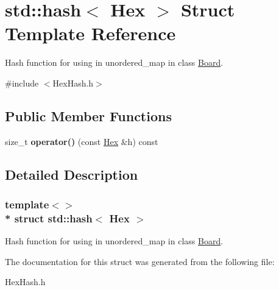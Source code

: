 \hypertarget{structstd_1_1hash_3_01Hex_01_4}{}\section{std\+:\+:hash$<$ Hex $>$ Struct Template Reference}
\label{structstd_1_1hash_3_01Hex_01_4}


Hash function for using in unordered\+\_\+map in class \hyperlink{classBoard}{Board}.  




{\ttfamily \#include $<$Hex\+Hash.\+h$>$}

\subsection*{Public Member Functions}
\begin{DoxyCompactItemize}
\item 
size\+\_\+t {\bfseries operator()} (const \hyperlink{classHex}{Hex} \&h) const \hypertarget{structstd_1_1hash_3_01Hex_01_4_a367202b40702ea479ccc72a798613a51}{}\label{structstd_1_1hash_3_01Hex_01_4_a367202b40702ea479ccc72a798613a51}

\end{DoxyCompactItemize}


\subsection{Detailed Description}
\subsubsection*{template$<$$>$\\*
struct std\+::hash$<$ Hex $>$}

Hash function for using in unordered\+\_\+map in class \hyperlink{classBoard}{Board}. 

The documentation for this struct was generated from the following file\+:\begin{DoxyCompactItemize}
\item 
Hex\+Hash.\+h\end{DoxyCompactItemize}
